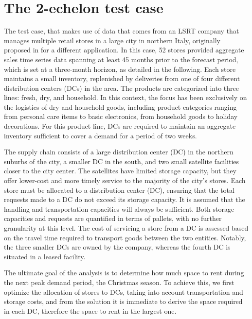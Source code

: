 \documentclass[11pt]{article}
\begin{document}
\section{The 2-echelon test case} \label{Sec:testcase}

The test case, that makes use of data that comes from an LSRT company that manages multiple retail stores in a large city in northern Italy, originally proposed in \citet{MZ23} for a different application. In this case, 52 stores provided aggregate sales time series data spanning at least 45 months prior to the forecast period, which is set at a three-month horizon, as detailed in the following. Each store maintains a small inventory, replenished by deliveries from one of four different distribution centers (DCs) in the area. The products are categorized into three lines: fresh, dry, and household. In this context, the focus has been exclusively on the logistics of dry and household goods, including product categories ranging from personal care items to basic electronics, from household goods to holiday decorations. For this product line, DCs are required to maintain an aggregate inventory sufficient to cover a demand for a period of two weeks.

The supply chain consists of a large distribution center (DC) in the northern suburbs of the city, a smaller DC in the south, and two small satellite facilities closer to the city center. The satellites have limited storage capacity, but they offer lower-cost and more timely service to the majority of the city's stores. 
Each store must be allocated to a distribution center (DC), ensuring that the total requests made to a DC do not exceed its storage capacity. It is assumed that the handling and transportation capacities will always be sufficient. Both storage capacities and requests are quantified in terms of pallets, with no further granularity at this level. The cost of servicing a store from a DC is assessed based on the travel time required to transport goods between the two entities. Notably, the three smaller DCs are owned by the company, whereas the fourth DC is situated in a leased facility.

The ultimate goal of the analysis is to determine how much space to rent during the next peak demand period, the Christmas season. To achieve this, we first optimize the allocation of stores to DCs, taking into account transportation and storage costs, and from the solution it is immediate to derive the space required in each DC, therefore the space to rent in the largest one.
\end{document}
